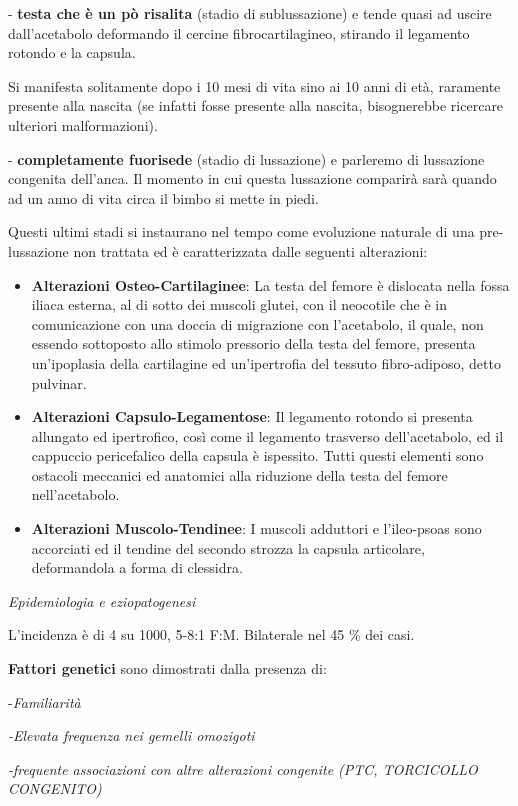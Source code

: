 \documentclass[]{article}
\begin{document}
- \textbf{testa che è un pò risalita} (stadio di sublussazione) e tende
quasi ad uscire dall'acetabolo deformando il cercine fibrocartilagineo,
stirando il legamento rotondo e la capsula.

Si manifesta solitamente dopo i 10 mesi di vita sino ai 10 anni di età,
raramente presente alla nascita (se infatti fosse presente alla nascita,
bisognerebbe ricercare ulteriori malformazioni).

- \textbf{completamente fuorisede} (stadio di lussazione) e parleremo di
lussazione congenita dell'anca. Il momento in cui questa lussazione
comparirà sarà quando ad un anno di vita circa il bimbo si mette in
piedi.

Questi ultimi stadi si instaurano nel tempo come evoluzione naturale di
una pre-lussazione non trattata ed è caratterizzata dalle seguenti
alterazioni:

\begin{itemize}
\item
  \textbf{Alterazioni Osteo-Cartilaginee}: La testa del femore è
  dislocata nella fossa iliaca esterna, al di sotto dei muscoli glutei,
  con il neocotile che è in comunicazione con una doccia di migrazione
  con l'acetabolo, il quale, non essendo sottoposto allo stimolo
  pressorio della testa del femore, presenta un'ipoplasia della
  cartilagine ed un'ipertrofia del tessuto fibro-adiposo, detto
  pulvinar.
\item
  \textbf{Alterazioni Capsulo-Legamentose}: Il legamento rotondo si
  presenta allungato ed ipertrofico, così come il legamento trasverso
  dell'acetabolo, ed il cappuccio pericefalico della capsula è
  ispessito. Tutti questi elementi sono ostacoli meccanici ed anatomici
  alla riduzione della testa del femore nell'acetabolo.
\item
  \textbf{Alterazioni Muscolo-Tendinee}: I muscoli adduttori e
  l'ileo-psoas sono accorciati ed il tendine del secondo strozza la
  capsula articolare, deformandola a forma di clessidra.
\end{itemize}

\emph{Epidemiologia e eziopatogenesi}

L'incidenza è di 4 su 1000, 5-8:1 F:M. Bilaterale nel 45 \% dei casi.

\textbf{Fattori genetici} sono dimostrati dalla presenza di:

-\emph{Familiarità}

\emph{-Elevata frequenza nei gemelli omozigoti}

\emph{-frequente associazioni con altre alterazioni congenite (PTC,
TORCICOLLO CONGENITO)}
\end{document}

